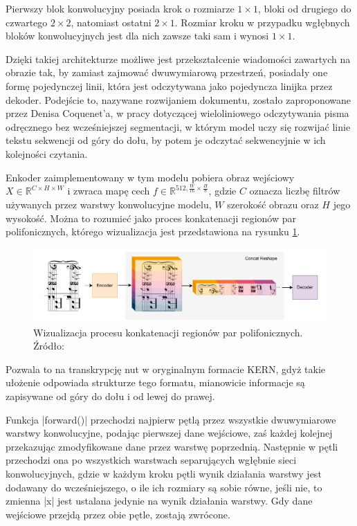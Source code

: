 Pierwszy blok konwolucyjny posiada krok o rozmiarze $1 \times 1$, bloki od drugiego do czwartego $2\times 2$, natomiast ostatni $2 \times 1$. Rozmiar kroku w przypadku wgłębnych bloków konwolucyjnych jest dla nich zawsze taki sam i wynosi $1 \times 1$.

Dzięki takiej architekturze możliwe jest przekształcenie wiadomości zawartych na obrazie tak, by zamiast zajmować dwuwymiarową przestrzeń, posiadały one formę pojedynczej linii, która jest odczytywana jako pojedyncza linijka przez dekoder. Podejście to, nazywane rozwijaniem dokumentu, zostało zaproponowane przez Denisa Coquenet'a, w pracy dotyczącej wieloliniowego odczytywania pisma odręcznego bez wcześniejszej segmentacji\cite{Coquenet2021}, w którym model uczy się rozwijać linie tekstu sekwencji od góry do dołu, by potem je odczytać sekwencyjnie w ich kolejności czytania. 

Enkoder zaimplementowany w tym modelu pobiera obraz wejściowy $X \in \mathbb{R}^{C\times H \times W}$ i zwraca mapę cech $f \in \mathbb{R}^{512, \frac{W}{16}\times\frac{H}{8}}$, gdzie $C$ oznacza liczbę filtrów używanych przez warstwy konwolucyjne modelu, $W$ szerokość obrazu oraz $H$ jego wysokość. Można to rozumieć jako proces konkatenacji regionów par polifonicznych, którego wizualizacja jest przedstawiona na rysunku \ref{fig:rowijanie-nut}.


\begin{figure}[h]
	\centering
	\includegraphics[width=15cm]{images/rozwijanie-nut.png}
	\caption{Wizualizacja procesu konkatenacji regionów par polifonicznych. Źródło: \cite{Rios-Vila2023}}
	\label{fig:rowijanie-nut}
\end{figure}


Pozwala to na transkrypcję nut w oryginalnym formacie KERN, gdyż takie ułożenie odpowiada strukturze tego formatu, mianowicie informacje są zapisywane od góry do dołu i od lewej do prawej.

Funkcja \pyth|forward()| przechodzi najpierw pętlą przez wszystkie dwuwymiarowe warstwy konwolucyjne, podając pierwszej dane wejściowe, zaś każdej kolejnej przekazując zmodyfikowane dane przez warstwę poprzednią. Następnie w pętli przechodzi ona po wszystkich warstwach separujących wgłębnie sieci konwolucyjnych, gdzie w każdym kroku pętli wynik działania warstwy jest dodawany do wcześniejszego, o ile ich rozmiary są sobie równe, jeśli nie, to zmienna \pyth|x| jest ustalana jedynie na wynik działania warstwy. Gdy dane wejściowe przejdą przez obie pętle, zostają zwrócone.



